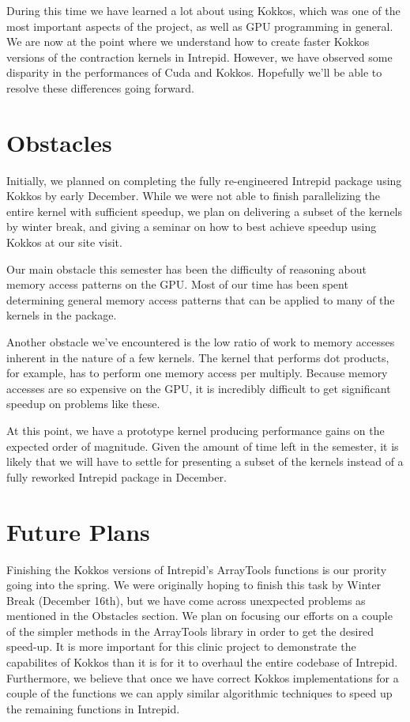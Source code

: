 \documentclass[midyear]{hmcclinic}
\begin{document}
During this time we have learned a lot about using
Kokkos, which was one of the most important aspects of the project, as well as
GPU programming in general. We are now at the point where we
understand how to create faster Kokkos versions of the contraction kernels in
Intrepid. However, we have observed some disparity in the performances of Cuda and
Kokkos. Hopefully we'll be able to resolve these differences going forward.



\section*{Obstacles}
Initially, we planned on completing the  fully re-engineered Intrepid
package using Kokkos by early December. While we were not able to 
finish parallelizing the entire kernel with sufficient speedup, we plan on 
delivering a subset of the kernels by winter break, and giving a seminar
on how to best achieve speedup using Kokkos at our site visit.

Our main obstacle this semester has been the difficulty of reasoning about 
memory access patterns on the GPU. Most of our time has been spent determining
general memory access patterns that can be applied to many of the kernels
in the package.

Another obstacle we've encountered is the low ratio of work to memory accesses 
inherent in the nature of a few kernels. The kernel that performs dot products, for example,
has to perform one memory access per multiply. Because memory accesses are so 
expensive on the GPU, it is incredibly difficult to get significant speedup on problems like 
these.

At this point, we have a prototype kernel producing performance gains on the expected
order of magnitude.  Given the amount of time left in the semester,
it is likely that we will have to settle for presenting a subset of the kernels
instead of a fully reworked Intrepid package in December. 

\section*{Future Plans}
Finishing the Kokkos versions of Intrepid's ArrayTools functions is our prority
going into the spring.  We were originally hoping to finish this task by Winter
Break (December 16th), but we have come across unexpected problems as mentioned
in the Obstacles section. We plan on focusing
our efforts on a couple of the simpler methods in the ArrayTools library in
order to get the desired speed-up. It is more important for this 
clinic project to demonstrate the capabilites of Kokkos than it is for it to
overhaul the entire codebase of Intrepid. Furthermore, we believe that once 
we have correct Kokkos implementations
for a couple of the functions we can apply similar algorithmic techniques
to speed up the remaining functions in Intrepid. 
\end{document}
